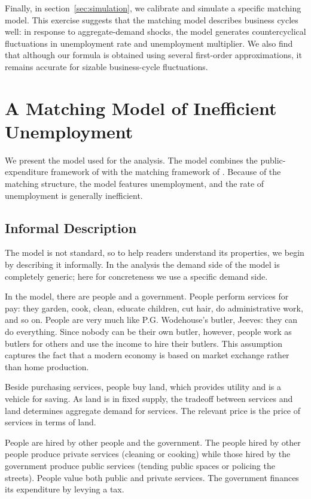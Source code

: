 \documentclass[letterpaper,12pt,leqno]{article}
\begin{document}
\begin{bibunit}
Finally, in section~\ref{sec:simulation}, we calibrate and simulate a specific matching model. This exercise suggests that the matching model describes business cycles well: in response to aggregate-demand shocks, the model generates countercyclical fluctuations in unemployment rate and unemployment multiplier. We also find that although our formula is obtained using several first-order approximations, it remains accurate for sizable business-cycle fluctuations.

\section{A Matching Model of Inefficient Unemployment}\label{sec:model}

We present the model used for the analysis. The model combines the public-expenditure framework of  with the matching framework of . Because of the matching structure, the model features unemployment, and the rate of unemployment is generally inefficient.

\subsection{Informal Description}

The model is not standard, so to help readers understand its properties, we begin by describing it informally. In the analysis the demand side of the model is completely generic; here for concreteness we use a specific demand side.

In the model, there are people and a government. People perform services for pay: they garden, cook, clean, educate children, cut hair, do administrative work, and so on. People are very much like P.G. Wodehouse's butler, Jeeves: they can do everything. Since nobody can be their own butler, however, people work as butlers for others and use the income to hire their butlers. This assumption captures the fact that a modern economy is based on market exchange rather than home production.

Beside purchasing services, people buy land, which provides utility and is a vehicle for saving. As land is in fixed supply, the tradeoff between services and land determines aggregate demand for services. The relevant price is the price of services in terms of land.

People are hired by other people and the government. The people hired by other people produce private services (cleaning or cooking) while those hired by the government produce public services (tending public spaces or policing the streets). People value both public and private services. The government finances its expenditure by levying a tax.


\end{bibunit}
\end{document}
